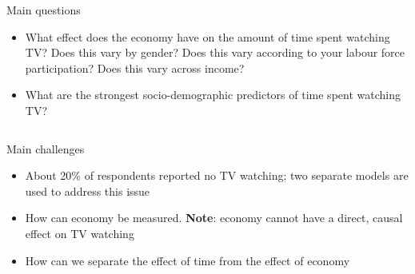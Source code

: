 \documentclass[final]{beamer}
\newcounter{acolumn}%
\def\autoheight{\vspace*{0pt}}%
\begin{document}
\begin{frame}
\begin{acolumns}[t]
\begin{column}{.32\linewidth}
\begin{block}{Main questions}
            \begin{itemize}
            	\item What effect does the economy have on the amount of time spent watching TV? Does this vary by gender? Does this vary according to your labour force participation? Does this vary across income?

            	\item What are the strongest socio-demographic predictors of time spent watching TV?
            \end{itemize}
            \autoheight
           \end{block}
              
          \end{column}
          
        \end{acolumns}
    
    
    \vfill 
    
    \begin{acolumns}[t]
              \begin{column}{.24\linewidth}
              
                \begin{block}{Main challenges}
        		  \begin{itemize}
        		  	\item About 20\% of respondents reported no TV watching; two separate models are used to address this issue
        		  	
        		  	\item How can economy be measured. \textbf{Note}: economy cannot have a direct, causal effect on TV watching
        		  	
        		  	\item How can we separate the effect of time from the effect of economy
        		  \end{itemize}
        			
                  \autoheight 
                \end{block}
                
              
              \end{column}
              

\end{acolumns}
\end{frame}
\end{document}
